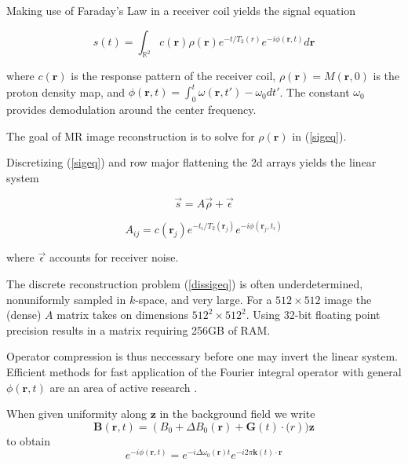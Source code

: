 \documentclass[11pt]{amsart}
\theoremstyle{remark}
\begin{document}
Making use of Faraday's Law in a receiver coil yields the signal equation

\begin{equation}\label{sigeq}
s(t) = \int_{\mathbb{R}^2}c(\mathbf{r})\rho(\mathbf{r})e^{-t/T_2(r)}e^{-i\phi(\mathbf{r},t)}d\mathbf{r}
\end{equation}

where $c(\mathbf{r})$ is the response pattern of the receiver coil, $\rho(\mathbf{r}) = M(\mathbf{r},0)$ is the proton density map, and $\phi(\mathbf{r},t) = \int_0^t \omega(\mathbf{r},t') - \omega_0 dt'$. The constant $\omega_0$ provides demodulation around the center frequency.


The goal of MR image reconstruction is to solve for $\rho(\mathbf{r})$ in (\ref{sigeq}).



Discretizing (\ref{sigeq}) and row major flattening the 2d arrays yields the linear system

\begin{equation}\label{dissigeq}
\vec{s} = A \vec{\rho} + \vec{\epsilon}
\end{equation}

\begin{equation}
A_{ij} = c(\mathbf{r}_j)e^{-t_i/T_2(\mathbf{r}_j)}e^{-i\phi(\mathbf{r}_j,t_i)}
\end{equation}

where $\vec{\epsilon}$ accounts for receiver noise.


The discrete reconstruction problem (\ref{dissigeq}) is often underdetermined, nonuniformly sampled in $k$-space, and very large. For a $512 \times 512$ image the (dense) $A$ matrix takes on dimensions $512^2 \times 512^2$. Using 32-bit floating point precision results in a matrix requiring 256GB of RAM.

Operator compression is thus neccessary before one may invert the linear system. Efficient
methods for fast application of the Fourier integral operator with
general $\phi(\mathbf{r},t)$ are an area of active research \cite{Cand2006}. 

When given uniformity along $\mathbf{z}$ in the background field we write
\begin{equation}
\mathbf{B}(\mathbf{r},t) = (B_0 + \Delta B_0(\mathbf{r}) + \mathbf{G}(t)\cdot \mathbf(r))\mathbf{z}
\end{equation}
to obtain
\begin{equation}
e^{-i\phi(\mathbf{r},t)} = e^{-i\Delta \omega_0(\mathbf{r})t}e^{-i2\pi \mathbf{k}(t)\cdot \mathbf{r}}
\end{equation}
\end{document}
